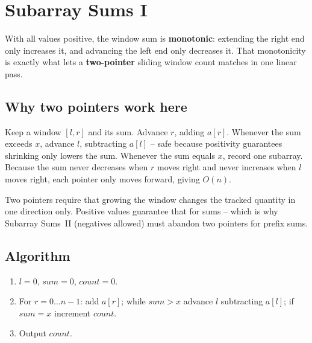 \section{Subarray Sums I}
\label{sec:cses-subarray-sums-i}


\begin{patternbox}
With all values positive, the window sum is \textbf{monotonic}: extending
the right end only increases it, and advancing the left end only decreases
it. That monotonicity is exactly what lets a \textbf{two-pointer} sliding
window count matches in one linear pass.
\end{patternbox}

\subsection*{Why two pointers work here}

Keep a window $[l,r]$ and its sum. Advance $r$, adding $a[r]$. Whenever the
sum exceeds $x$, advance $l$, subtracting $a[l]$ -- safe because positivity
guarantees shrinking only lowers the sum. Whenever the sum equals $x$,
record one subarray. Because the sum never decreases when $r$ moves right
and never increases when $l$ moves right, each pointer only moves forward,
giving $O(n)$.

\begin{ideabox}
Two pointers require that growing the window changes the tracked quantity
in one direction only. Positive values guarantee that for sums -- which is
why Subarray Sums~II (negatives allowed) must abandon two pointers for
prefix sums.
\end{ideabox}

\subsection*{Algorithm}

\begin{enumerate}
  \item $l=0$, $\textit{sum}=0$, $\textit{count}=0$.
  \item For $r=0\ldots n-1$: add $a[r]$; while $\textit{sum}>x$ advance
        $l$ subtracting $a[l]$; if $\textit{sum}=x$ increment
        $\textit{count}$.
  \item Output $\textit{count}$.
\end{enumerate}

